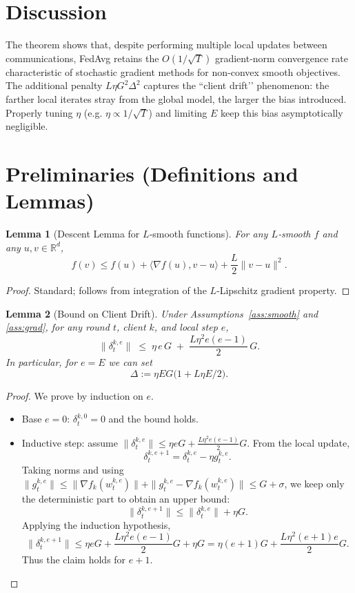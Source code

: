 \documentclass{article}
\newcommand{\R}{\mathbb{R}}
\newtheorem{lemma}{Lemma}
\begin{document}
\section*{Discussion}
The theorem shows that, despite performing multiple local updates
between communications, FedAvg retains the $O(1/\sqrt{T})$ gradient‑norm
convergence rate characteristic of stochastic gradient methods for
non‑convex smooth objectives. The additional penalty $L\eta G^2\Delta^2$
captures the ``client drift’’ phenomenon: the farther local iterates stray
from the global model, the larger the bias introduced. Properly tuning
$\eta$ (e.g. $\eta\propto 1/\sqrt{T}$) and limiting $E$ keep this bias
asymptotically negligible.

\newpage

\section*{Preliminaries (Definitions and Lemmas)}

\begin{lemma}[Descent Lemma for $L$‑smooth functions]\label{lem:descent}
For any $L$‑smooth $f$ and any $u,v\in\R^d$,
\[
f(v)\le f(u)+\langle\nabla f(u),v-u\rangle+\frac{L}{2}\|v-u\|^2 .
\]
\end{lemma}
\begin{proof}
Standard; follows from integration of the $L$‑Lipschitz gradient property.
\end{proof}

\begin{lemma}[Bound on Client Drift]\label{lem:drift}
Under Assumptions~\ref{ass:smooth} and \ref{ass:grad},
for any round $t$, client $k$, and local step $e$,
\[
\|\delta_{t}^{k,e}\|
\;\le\;
\eta\,e\,G
\;+\;
\frac{L\eta^2 e(e-1)}{2}\,G .
\]
In particular, for $e=E$ we can set
\[
\Delta := \eta E G\bigl(1+L\eta E/2\bigr).
\]
\end{lemma}
\begin{proof}
We prove by induction on $e$.
\begin{itemize}
\item[$\bullet$] Base $e=0$: $\delta_{t}^{k,0}=0$ and the bound holds.
\item[$\bullet$] Inductive step: assume $\|\delta_{t}^{k,e}\|\le
\eta e G +\frac{L\eta^2 e(e-1)}{2}G$.
From the local update,
\[
\delta_{t}^{k,e+1}= \delta_{t}^{k,e} -\eta g_{t}^{k,e}.
\]
Taking norms and using $\|g_{t}^{k,e}\|\le\|\nabla f_k(w_{t}^{k,e})\|+ \|g_{t}^{k,e}-\nabla f_k(w_{t}^{k,e})\|
\le G+\sigma$, we keep only the deterministic part to obtain an upper bound:
\[
\|\delta_{t}^{k,e+1}\|
\le \|\delta_{t}^{k,e}\|+\eta G .
\]
Applying the induction hypothesis,
\[
\|\delta_{t}^{k,e+1}\|
\le \eta e G +\frac{L\eta^2 e(e-1)}{2}G +\eta G
= \eta (e+1)G +\frac{L\eta^2 (e+1)e}{2}G .
\]
Thus the claim holds for $e+1$.
\end{itemize}
\end{proof}
\end{document}
